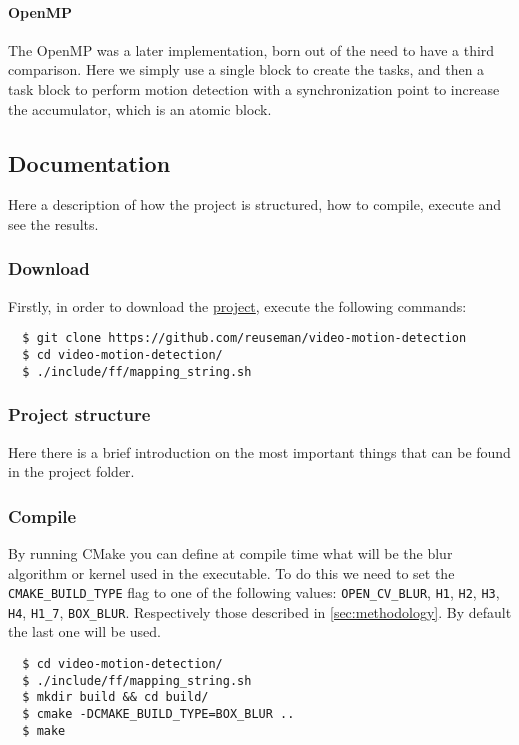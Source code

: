 \paragraph{OpenMP} The OpenMP was a later implementation, born out of the need to have a third comparison. Here we simply use a single block to create the tasks, and then a task block to perform motion detection with a synchronization point to increase the accumulator, which is an atomic block.

\subsection{Documentation}
Here a description of how the project is structured, how to compile, execute and see the results.

\subsubsection{Download}
Firstly, in order to download the \href{https://github.com/reuseman/video-motion-detection}{project}, execute the following commands:

\begin{verbatim}
  $ git clone https://github.com/reuseman/video-motion-detection
  $ cd video-motion-detection/
  $ ./include/ff/mapping_string.sh
\end{verbatim}

\subsubsection{Project structure}
Here there is a brief introduction on the most important things that can be found in the project folder.

\subsubsection{Compile}
By running CMake you can define at compile time what will be the blur algorithm or kernel used in the executable. To do this we need to set the \texttt{CMAKE_BUILD_TYPE} flag to one of the following values: \texttt{OPEN_CV_BLUR}, \texttt{H1}, \texttt{H2}, \texttt{H3}, \texttt{H4}, \texttt{H1_7}, \texttt{BOX_BLUR}. Respectively those described in \cref{sec:methodology}. By default the last one will be used.
\begin{verbatim}
  $ cd video-motion-detection/
  $ ./include/ff/mapping_string.sh
  $ mkdir build && cd build/
  $ cmake -DCMAKE_BUILD_TYPE=BOX_BLUR ..
  $ make
\end{verbatim}


